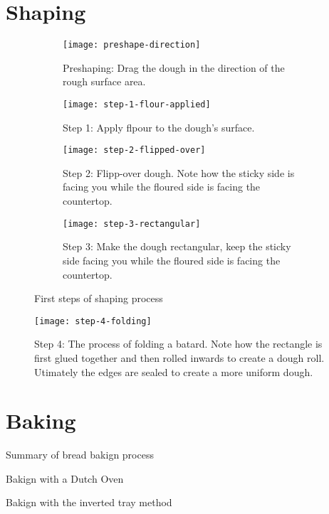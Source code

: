 \documentclass[paper=a4, twoside=false, fontsize=12pt]{scrbook}
\begin{document}
\section*{Shaping}
\begin{flowchart}[!htb]

\end{flowchart}

\begin{figure*}[!htb]
\begin{subfigure}{.475\linewidth}
  \texttt{[image: preshape-direction]}
  \caption*{Preshaping: Drag the dough in the direction of the rough surface
  area.}%
  \label{fig:preshape-direction}
\end{subfigure}
\begin{subfigure}{.475\linewidth}
  \texttt{[image: step-1-flour-applied]}
  \caption*{Step 1: Apply flpour to the dough's surface.}%
  \label{fig:shaping-flour-surface}
\end{subfigure}\hfill %
\medskip %
\begin{subfigure}{.475\linewidth}
  \texttt{[image: step-2-flipped-over]}
  \caption*{Step 2: Flipp-over dough. Note how the sticky side is facing you
  while the floured side is facing the countertop.}
\end{subfigure}\hfill %
\begin{subfigure}{.475\linewidth}
  \texttt{[image: step-3-rectangular]}
  \caption*{Step 3: Make the dough rectangular, keep the sticky side facing
  you while the floured side is facing the countertop.}%
  \label{fig:shaping-rectangular-dough}
\end{subfigure}
\caption*{First steps of shaping process}
\end{figure*}

\begin{figure*}[htb!]
  \texttt{[image: step-4-folding]}
  \caption*{Step 4: The process of folding a batard.  Note how the rectangle
  is first glued together and then rolled inwards to create a dough roll.
  Utimately the edges are sealed to create a more uniform dough.}%
  \label{fig:shaping-folding}
\end{figure*}
\clearpage{}

\section*{Baking}
\begin{flowchart}[!htb]

\caption*{Summary of bread bakign process}
\end{flowchart}

\begin{flowchart*}[!htb]

\caption*{Bakign with a Dutch Oven}
\end{flowchart*}

\begin{flowchart}[!htb]

\caption*{Bakign with the inverted tray method}
\end{flowchart}
\clearpage{}
\end{document}

